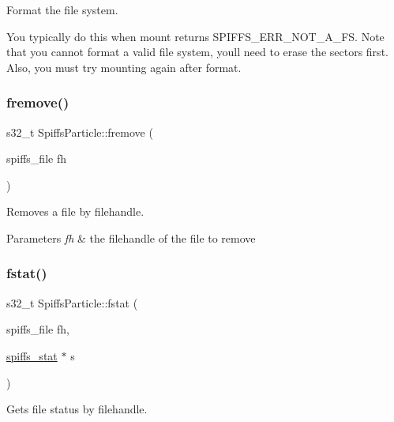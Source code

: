 Format the file system. 

You typically do this when mount returns S\+P\+I\+F\+F\+S\+\_\+\+E\+R\+R\+\_\+\+N\+O\+T\+\_\+\+A\+\_\+\+FS. Note that you cannot format a valid file system, you\textquotesingle{}ll need to erase the sectors first. Also, you must try mounting again after format. \mbox{\label{class_spiffs_particle_a19073c6608c352f93e4a5cff6bb95fb8}} 
\subsubsection{\texorpdfstring{fremove()}{fremove()}}
{\footnotesize\ttfamily s32\+\_\+t Spiffs\+Particle\+::fremove (\begin{DoxyParamCaption}\item[{spiffs\+\_\+file}]{fh }\end{DoxyParamCaption})\hspace{0.3cm}{\ttfamily [inline]}}



Removes a file by filehandle. 


\begin{DoxyParams}{Parameters}
{\em fh} & the filehandle of the file to remove \\
\hline
\end{DoxyParams}
\mbox{\label{class_spiffs_particle_a2ea24c9aded8801cafd373b11dd912d7}} 
\subsubsection{\texorpdfstring{fstat()}{fstat()}}
{\footnotesize\ttfamily s32\+\_\+t Spiffs\+Particle\+::fstat (\begin{DoxyParamCaption}\item[{spiffs\+\_\+file}]{fh,  }\item[{\mbox{\hyperlink{structspiffs__stat}{spiffs\+\_\+stat}} $\ast$}]{s }\end{DoxyParamCaption})\hspace{0.3cm}{\ttfamily [inline]}}



Gets file status by filehandle. 


